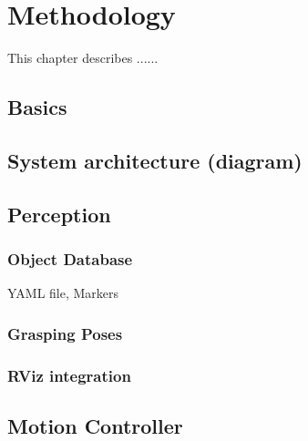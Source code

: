 
\chapter{Methodology}

This chapter describes ......

\section{Basics}


\section{System architecture (diagram)}
\section{Perception}
\subsection{Object Database}
YAML file, Markers
\subsection{Grasping Poses}
\subsection{RViz integration}

\section{Motion Controller}
\label{sec:motion_controller}


